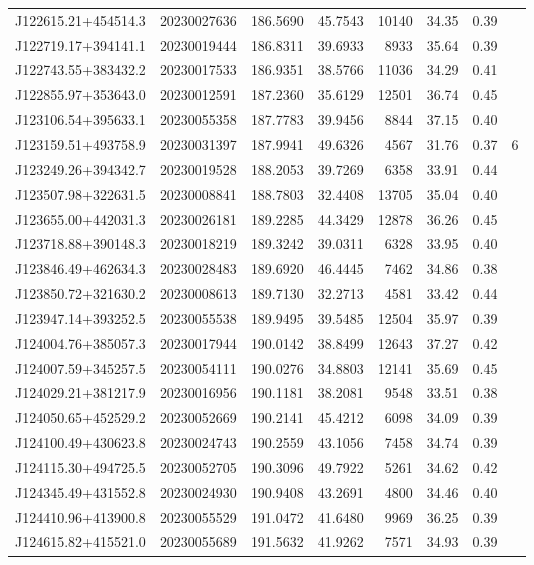 \documentclass{article}
\begin{document}
\begin {longtable}{|l|l|r|r|r|r|r|l|}
 J122615.21+454514.3&  20230027636&  186.5690&   45.7543& 10140& 34.35& 0.39&\\
 J122719.17+394141.1&  20230019444&  186.8311&   39.6933&  8933& 35.64& 0.39&\\
 J122743.55+383432.2&  20230017533&  186.9351&   38.5766& 11036& 34.29& 0.41&\\
 J122855.97+353643.0&  20230012591&  187.2360&   35.6129& 12501& 36.74& 0.45&\\
 J123106.54+395633.1&  20230055358&  187.7783&   39.9456&  8844& 37.15& 0.40&\\
 J123159.51+493758.9&  20230031397&  187.9941&   49.6326&  4567& 31.76& 0.37&6\\
 J123249.26+394342.7&  20230019528&  188.2053&   39.7269&  6358& 33.91& 0.44&\\
 J123507.98+322631.5&  20230008841&  188.7803&   32.4408& 13705& 35.04& 0.40&\\
 J123655.00+442031.3&  20230026181&  189.2285&   44.3429& 12878& 36.26& 0.45&\\
 J123718.88+390148.3&  20230018219&  189.3242&   39.0311&  6328& 33.95& 0.40&\\
 J123846.49+462634.3&  20230028483&  189.6920&   46.4445&  7462& 34.86& 0.38&\\
 J123850.72+321630.2&  20230008613&  189.7130&   32.2713&  4581& 33.42& 0.44&\\
 J123947.14+393252.5&  20230055538&  189.9495&   39.5485& 12504& 35.97& 0.39&\\
 J124004.76+385057.3&  20230017944&  190.0142&   38.8499& 12643& 37.27& 0.42&\\
 J124007.59+345257.5&  20230054111&  190.0276&   34.8803& 12141& 35.69& 0.45&\\
 J124029.21+381217.9&  20230016956&  190.1181&   38.2081&  9548& 33.51& 0.38&\\
 J124050.65+452529.2&  20230052669&  190.2141&   45.4212&  6098& 34.09& 0.39&\\
 J124100.49+430623.8&  20230024743&  190.2559&   43.1056&  7458& 34.74& 0.39&\\
 J124115.30+494725.5&  20230052705&  190.3096&   49.7922&  5261& 34.62& 0.42&\\
 J124345.49+431552.8&  20230024930&  190.9408&   43.2691&  4800& 34.46& 0.40&\\
 J124410.96+413900.8&  20230055529&  191.0472&   41.6480&  9969& 36.25& 0.39&\\
 J124615.82+415521.0&  20230055689&  191.5632&   41.9262&  7571& 34.93& 0.39&\\

\end{longtable}
\end{document}
